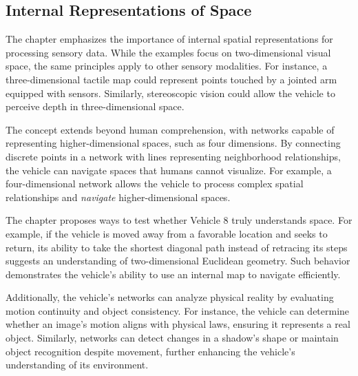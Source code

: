 \documentclass{article}
\begin{document}
	\subsection*{Internal Representations of Space}

	The chapter emphasizes the importance of internal spatial representations for processing sensory data. While the examples focus on two-dimensional visual space, the same principles apply to other sensory modalities. For instance, a three-dimensional tactile map could represent points touched by a jointed arm equipped with sensors. Similarly, stereoscopic vision could allow the vehicle to perceive depth in three-dimensional space.

	The concept extends beyond human comprehension, with networks capable of representing higher-dimensional spaces, such as four dimensions. By connecting discrete points in a network with lines representing neighborhood relationships, the vehicle can navigate spaces that humans cannot visualize. For example, a four-dimensional network allows the vehicle to process complex spatial relationships and \textit{navigate} higher-dimensional spaces.

	The chapter proposes ways to test whether Vehicle 8 truly understands space. For example, if the vehicle is moved away from a favorable location and seeks to return, its ability to take the shortest diagonal path instead of retracing its steps suggests an understanding of two-dimensional Euclidean geometry. Such behavior demonstrates the vehicle's ability to use an internal map to navigate efficiently.

	Additionally, the vehicle's networks can analyze physical reality by evaluating motion continuity and object consistency. For instance, the vehicle can determine whether an image's motion aligns with physical laws, ensuring it represents a real object. Similarly, networks can detect changes in a shadow's shape or maintain object recognition despite movement, further enhancing the vehicle's understanding of its environment.
\end{document}
